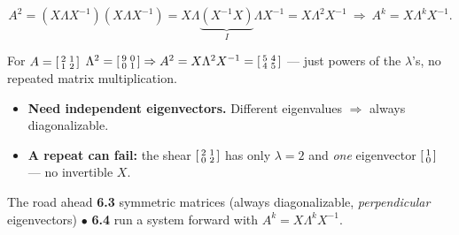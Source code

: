 \documentclass[aspectratio=169, 11pt]{beamer}
\begin{document}
\begin{frame}[t, plain]
  \[ A^2=(X\Lambda X^{-1})(X\Lambda X^{-1})=X\Lambda\underbrace{(X^{-1}X)}_{I}\Lambda X^{-1}=X\Lambda^2X^{-1}
     \ \Longrightarrow\ A^k=X\Lambda^k X^{-1}. \]
  \begin{block}{For $A=\begin{bsmallmatrix} 2 & 1\\ 1 & 2 \end{bsmallmatrix}$}
    $\Lambda^2=\begin{bsmallmatrix}9&0\\0&1\end{bsmallmatrix}\Rightarrow
     A^2=X\Lambda^2X^{-1}=\begin{bsmallmatrix}5&4\\4&5\end{bsmallmatrix}$ --- just powers of the $\lambda$'s,
     no repeated matrix multiplication.
  \end{block}
\end{frame}

\begin{frame}[t, plain]
  \begin{itemize}
    \setlength{\itemsep}{6pt}
    \item \textbf{Need independent eigenvectors.} Different eigenvalues $\Rightarrow$ always diagonalizable.
    \item \textbf{A repeat can fail:} the shear $\begin{bsmallmatrix} 2 & 1\\ 0 & 2 \end{bsmallmatrix}$ has
          only $\lambda=2$ and \emph{one} eigenvector $\begin{bsmallmatrix}1\\0\end{bsmallmatrix}$ --- no invertible $X$.
  \end{itemize}
  \begin{block}{The road ahead}
    \textbf{6.3} symmetric matrices (always diagonalizable, \emph{perpendicular} eigenvectors)
    \;$\bullet$\; \textbf{6.4} run a system forward with $A^k=X\Lambda^k X^{-1}$.
  \end{block}
\end{frame}
\end{document}
